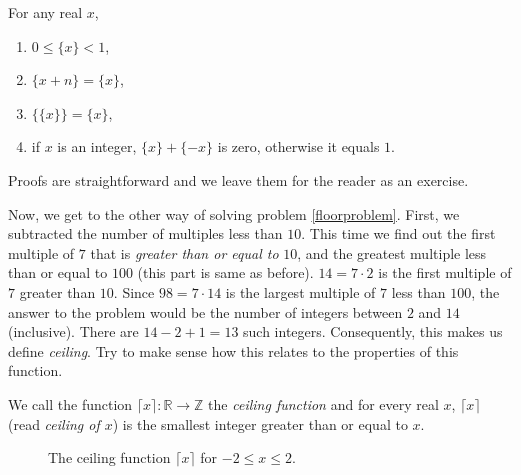 \begin{proposition}
For any real $x$,
\begin{enumerate}[1.]
	\item $0\leq\{x\}<1$,
	\item  $\{ x+n\}=\{ x\}$,
	\item $\{\{x\}\} =  \{x\}$,
	\item if $x$ is an integer, $\{ x\}+\{ -x\}$ is zero, otherwise it equals $1$.
\end{enumerate}
\end{proposition}

Proofs are straightforward and we leave them for the reader as an exercise.


Now, we get to the other way of solving problem \ref{floorproblem}. First, we subtracted the number of multiples less than $10$. This time we find out the first multiple of $7$ that is \textit{greater than or equal to} $10$, and the greatest multiple less than or equal to $100$ (this part is same as before). $14=7\cdot2$ is the first multiple of $7$ greater than $10$. Since $98=7\cdot14$ is the largest multiple of $7$ less than $100$, the answer to the problem would be the number of integers between $2$ and $14$ (inclusive). There are $14-2+1=13$ such integers. Consequently, this makes us define \textit{ceiling}. Try to make sense how this relates to the properties of this function.

\begin{definition}
We call the function $\lceil x \rceil: \mathbb{R} \to \mathbb Z$ the \textit{ceiling function} and for every real $x$, $\lceil x\rceil$ (read \textit{ceiling of $x$}) is the smallest integer greater than or equal to $x$.

\begin{figure}
	\centering
	\caption{The ceiling function $\lceil x \rceil$ for $-2 \leq x \leq 2$.}
	\label{fig:ceilingfunction}
\end{figure}
\end{definition}

